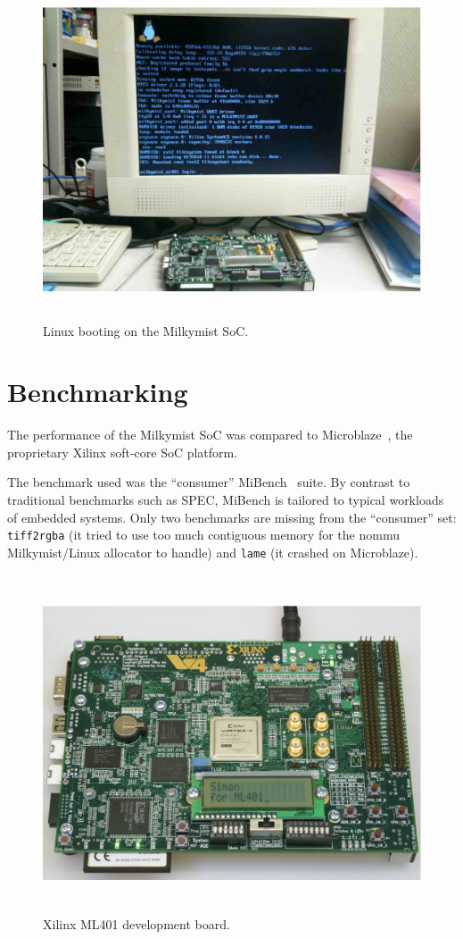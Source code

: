 \documentclass[a4paper,11pt]{kthesis}
\begin{document}
\begin{figure}[htp]
\centering
\includegraphics[height=100mm]{linux.eps}
\caption{Linux booting on the Milkymist SoC.}
\label{fig:linux}
\end{figure}

\section{Benchmarking}
The performance of the Milkymist SoC was compared to Microblaze~\cite{microblaze}, the proprietary Xilinx soft-core SoC platform.

The benchmark used was the ``consumer'' MiBench~\cite{mibench} suite. By contrast to traditional benchmarks such as SPEC, MiBench is tailored to typical workloads of embedded systems. Only two benchmarks are missing from the ``consumer'' set: \verb!tiff2rgba! (it tried to use too much contiguous memory for the nommu Milkymist/Linux allocator to handle) and \verb!lame! (it crashed on Microblaze).

\begin{figure}[htp]
\centering
\includegraphics[height=100mm]{ml401.eps}
\caption{Xilinx ML401 development board.}
\label{fig:ml401}
\end{figure}
\end{document}
